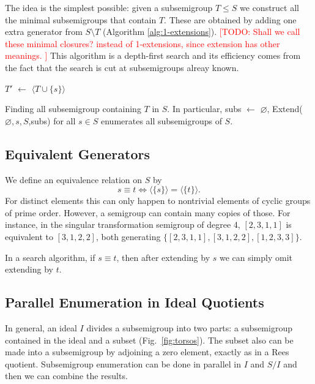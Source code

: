 \documentclass{amsart}
\newcommand{\todo}[1]{\textcolor{red}{ \small \textsf{[TODO:  #1 ]} \normalsize}}
\theoremstyle{plain}
\theoremstyle{definition}
\begin{document}
The idea is the simplest possible: given a subsemigroup $T\leq S$ we construct all the minimal subsemigroups that contain $T$.
These are obtained by adding one extra generator from $S\setminus T$ (Algorithm \ref{alg:1-extensions}).
\todo{Shall we call these minimal closures? instead of 1-extensions, since extension has other meanings.} 
This algorithm is a depth-first search and its efficiency comes from the fact that the search is cut at subsemigroups alreay known. 
\begin{algorithm}
\BlankLine
\Name{}
$T'$ $\leftarrow$ $\langle T\cup\{s\}\rangle$\\
\caption{Finding all subsemigroup containing $T$ in $S$. In particular, \textsf{subs} $\leftarrow$ $\varnothing$,  \textsf{Extend}($\varnothing,s,S$,\textsf{subs}) for all  $s\in S$ enumerates all subsemigroups of $S$.}
\label{alg:1-extensions}
\end{algorithm}

\subsection{Equivalent Generators}

We define an equivalence relation on $S$ by
$$ s\equiv t \Longleftrightarrow \langle\{s\} \rangle= \langle\{t\} \rangle.$$
For distinct elements this can only happen to nontrivial elements of cyclic groups of prime order.
However, a semigroup can contain many copies of those.
For instance, in the singular transformation semigroup of degree 4, $[ 2, 3, 1, 1 ]$ is equivalent to  $[ 3, 1, 2, 2 ]$, both generating $\{ [ 2, 3, 1, 1 ], [ 3, 1, 2, 2 ], [ 1, 2, 3, 3 ]\}$.

In a search algorithm, if $s\equiv t$, then after extending by $s$ we can simply omit extending by $t$.
\subsection{Parallel Enumeration in Ideal Quotients}
In general, an ideal $I$ divides a subsemigroup into two parts: a subsemigroup contained in the ideal and a subset (Fig.\ \ref{fig:torsos}).
The subset also can be made into a subsemigroup by adjoining a zero element, exactly as in a Rees quotient. 
Subsemigroup enumeration can be done in parallel in $I$ and $S/I$  and then  we can combine the results.
\end{document}
